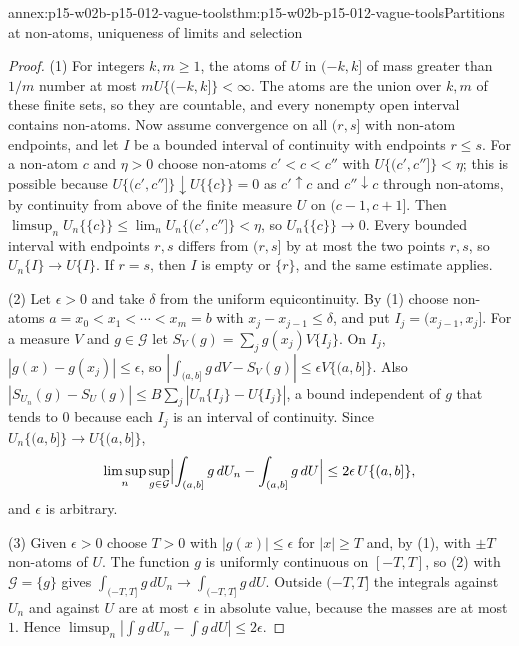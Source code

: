 \begin{annexitem}{annex:p15-w02b-p15-012-vague-tools}{thm:p15-w02b-p15-012-vague-tools}{Partitions at non-atoms, uniqueness of limits and selection}
\begin{proof}
(1) For integers \(k,m\geq1\), the atoms of \(U\) in \((-k,k]\) of mass greater
than \(1/m\) number at most \(mU\{(-k,k]\}<\infty\). The atoms are the union
over \(k,m\) of these finite sets, so they are countable, and every
nonempty open interval contains non-atoms. Now assume convergence on all
\((r,s]\) with non-atom endpoints, and let \(I\) be a bounded interval of
continuity with endpoints \(r\leq s\). For a non-atom \(c\) and \(\eta>0\)
choose non-atoms \(c'<c<c''\) with \(U\{(c',c'']\}<\eta\); this is possible
because \(U\{(c',c'']\}\downarrow U\{\{c\}\}=0\) as \(c'\uparrow c\) and
\(c''\downarrow c\) through non-atoms, by continuity from above of the finite
measure \(U\) on \((c-1,c+1]\). Then
\(\limsup_nU_n\{\{c\}\}\leq\lim_nU_n\{(c',c'']\}<\eta\), so
\(U_n\{\{c\}\}\to0\). Every bounded interval with endpoints \(r,s\) differs
from \((r,s]\) by at most the two points \(r,s\), so \(U_n\{I\}\to U\{I\}\).
If \(r=s\), then \(I\) is empty or \(\{r\}\), and the same estimate applies.

(2) Let \(\epsilon>0\) and take \(\delta\) from the uniform equicontinuity.
By (1) choose non-atoms \(a=x_0<x_1<\cdots<x_m=b\) with
\(x_j-x_{j-1}\leq\delta\), and put \(I_j=(x_{j-1},x_j]\). For a measure \(V\)
and \(g\in\mathcal G\) let \(S_V(g)=\sum_jg(x_j)V\{I_j\}\). On \(I_j\),
\(|g(x)-g(x_j)|\leq\epsilon\), so
\(|\int_{(a,b]}g\,dV-S_V(g)|\leq\epsilon V\{(a,b]\}\). Also
\(|S_{U_n}(g)-S_U(g)|\leq B\sum_j|U_n\{I_j\}-U\{I_j\}|\), a bound independent
of \(g\) that tends to \(0\) because each \(I_j\) is an interval of continuity.
Since \(U_n\{(a,b]\}\to U\{(a,b]\}\),
\[
 \limsup_n\sup_{g\in\mathcal G}\Bigl|\int_{(a,b]}g\,dU_n-\int_{(a,b]}g\,dU\Bigr|
   \leq2\epsilon\,U\{(a,b]\},
\]
and \(\epsilon\) is arbitrary.

(3) Given \(\epsilon>0\) choose \(T>0\) with \(|g(x)|\leq\epsilon\) for
\(|x|\geq T\) and, by (1), with \(\pm T\) non-atoms of \(U\). The function
\(g\) is uniformly continuous on \([-T,T]\), so (2) with
\(\mathcal G=\{g\}\) gives \(\int_{(-T,T]}g\,dU_n\to\int_{(-T,T]}g\,dU\).
Outside \((-T,T]\) the integrals against \(U_n\) and against \(U\) are at most
\(\epsilon\) in absolute value, because the masses are at most \(1\). Hence
\(\limsup_n|\int g\,dU_n-\int g\,dU|\leq2\epsilon\).


\end{proof}
\end{annexitem}
